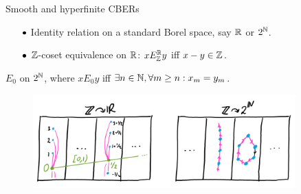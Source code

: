 \documentclass{beamer}
\begin{document}
    \begin{frame}{Smooth and hyperfinite CBERs}
        \vspace{-0.34in}
        \begin{example}[Smooth]
            \begin{itemize}
                \item[\scriptsize$\bullet$] Identity relation on a standard Borel space, say $\mathbb{R}$ or $2^{\mathbb{N}}$.
                \item[\scriptsize$\bullet$] $\mathbb{Z}$-coset equivalence on $\mathbb{R}$: $xE^{\mathbb{R}}_{\mathbb{Z}} y$ iff $x-y\in\mathbb{Z}$.
            \end{itemize}
        \end{example}

        \vspace{-0.1in}

        \begin{example}[Hyperfinite]
            $E_0$ on $2^{\mathbb{N}}$, where $xE_0y$ iff $\exists n\in\mathbb{N},\forall m\geq n:x_m=y_m$.
        \end{example}

        \vspace{-0.15in}

        \begin{figure}[h]
            \center
            \includegraphics[width=0.9\textwidth]{img/smooth_hyperfinite.png}
        \end{figure}
    \end{frame}
\end{document}
